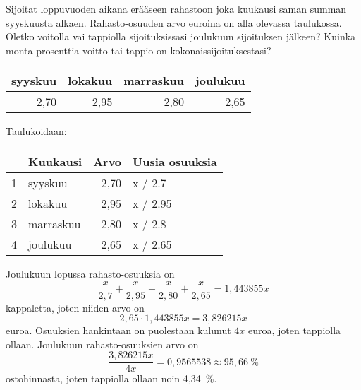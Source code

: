 \documentclass{article}\usepackage[]{graphicx}\usepackage[]{color}
\begin{document}
\begin{question} 
    Sijoitat loppuvuoden aikana erääseen rahastoon joka kuukausi saman summan syyskuusta alkaen. Rahasto-osuuden arvo euroina on alla olevassa taulukossa. Oletko voitolla vai tappiolla sijoituksissasi joulukuun sijoituksen jälkeen? Kuinka monta prosenttia voitto tai tappio on kokonaissijoituksestasi?
\begin{table}[ht]
\centering
\begin{tabular}{rrrr}
  \hline
syyskuu & lokakuu & marraskuu & joulukuu \\ 
  \hline
2,70 & 2,95 & 2,80 & 2,65 \\ 
   \hline
\end{tabular}
\end{table}

\end{question}
\begin{solution}
    Taulukoidaan:
\begin{table}[ht]
\centering
\begin{tabular}{rlrl}
  \hline
 & Kuukausi & Arvo & Uusia osuuksia \\ 
  \hline
1 & syyskuu & 2,70 & x / 2.7 \\ 
  2 & lokakuu & 2,95 & x / 2.95 \\ 
  3 & marraskuu & 2,80 & x / 2.8 \\ 
  4 & joulukuu & 2,65 & x / 2.65 \\ 
   \hline
\end{tabular}
\end{table}

\noindent
Joulukuun lopussa rahasto-osuuksia on 
    \[  
        \frac{x}{2,7} + \frac{x}{2,95} + \frac{x}{2,80} + \frac{x}{2,65} = 1{,}443855x
    \]
    kappaletta, joten niiden arvo on 
    \[
        2,65\cdot1{,}443855x = 3{,}826215x
    \] euroa. Osuuksien hankintaan on puolestaan kulunut \(4x\) euroa, joten tappiolla ollaan. Joulukuun rahasto-osuuksien arvo on 
    \[
        \frac{3{,}826215x}{4x} = 0{,}9565538 \approx 95{,}66~\%
    \]
    ostohinnasta, joten tappiolla ollaan noin 4{,}34~\%. 

\end{solution}
\end{document}

